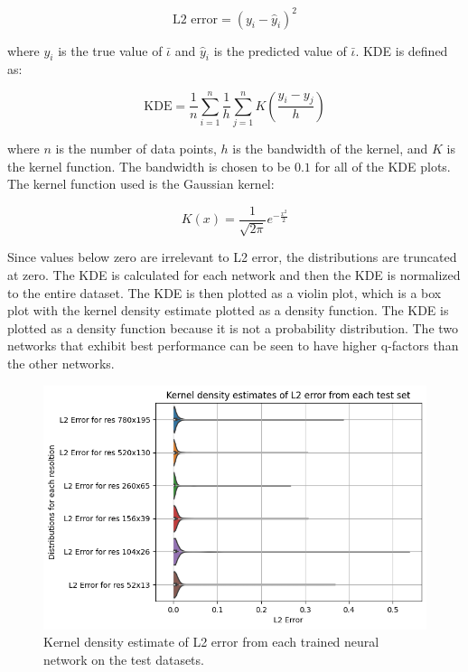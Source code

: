 \begin{equation}
    \label{eq:l2}
    \text{L2 error} = (y_i - \hat{y}_i)^2
\end{equation}

where $y_i$ is the true value of $\bar{\iota}$ and $\hat{y}_i$ is the predicted value of $\bar{\iota}$. KDE is defined as:

\begin{equation}
    \label{eq:kde}
    \text{KDE} = \frac{1}{n} \sum_{i=1}^n \frac{1}{h} \sum_{j=1}^n K\left(\frac{y_i - y_j}{h}\right)
\end{equation}

where $n$ is the number of data points, $h$ is the bandwidth of the kernel, and $K$ is the kernel function. The bandwidth is chosen to be $0.1$ for all of the KDE plots. The kernel function used is the Gaussian kernel:

\begin{equation}
    \label{eq:gaussian}
    K(x) = \frac{1}{\sqrt{2 \pi}} e^{-\frac{x^2}{2}}
\end{equation}

Since values below zero are irrelevant to L2 error, the distributions are truncated at zero. The KDE is calculated for each network and then the KDE is normalized to the entire dataset. The KDE is then plotted as a violin plot, which is a box plot with the kernel density estimate plotted as a density function. The KDE is plotted as a density function because it is not a probability distribution. The two networks that exhibit best performance can be seen to have higher q-factors than the other networks.

\begin{figure}[!htb]
    \centering
    \includegraphics[width = \textwidth]{images/kde_plot.png}
    \caption{Kernel density estimate of L2 error from each trained neural network on the test datasets.} \label{fig:kde}
\end{figure}

